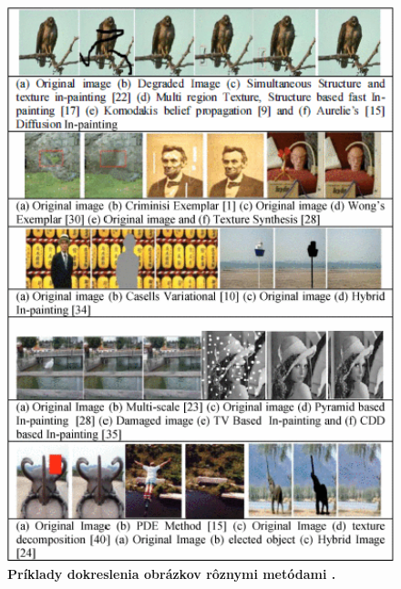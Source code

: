 \begin{figure}[h!]
    \centering
    \includegraphics[width=11.25cm]{assets/images/inpainting.png}
    \caption{
        \textbf{Príklady dokreslenia obrázkov rôznymi metódami \cite{6544390}.}
    }
    \label{fig:inpainting}
\end{figure}





